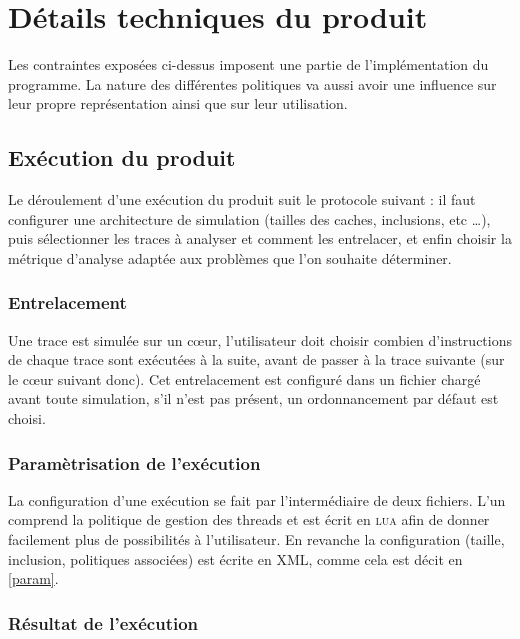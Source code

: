 \section{Détails techniques du produit}

Les contraintes exposées ci-dessus imposent une partie de l'implémentation du programme. La nature des différentes politiques va aussi avoir une influence sur leur propre représentation ainsi que sur leur utilisation.

\subsection{Exécution du produit}

Le déroulement d'une exécution du produit suit le protocole suivant : il faut configurer une architecture de simulation (tailles des caches, inclusions, etc \ldots), puis sélectionner les traces à analyser et comment les entrelacer, et enfin choisir la métrique d'analyse adaptée aux problèmes que l'on souhaite déterminer.

\subsubsection{Entrelacement}

Une trace est simulée sur un c\oe ur, l'utilisateur doit choisir combien d'instructions de chaque trace sont exécutées à la suite, avant de passer à la trace suivante (sur le c\oe ur suivant donc). Cet entrelacement est configuré dans un fichier chargé avant toute simulation, s'il n'est pas présent, un ordonnancement par défaut est choisi. 

\subsubsection{Paramètrisation de l'exécution}

La configuration d'une exécution se fait par l'intermédiaire de deux fichiers. L'un comprend la politique de gestion des threads et est écrit en \textsc{lua} afin de donner facilement plus de possibilités à l'utilisateur. En revanche la configuration (taille, inclusion, politiques associées) est écrite en \textsc{XML}, comme cela est décit en \ref{param}.

\subsubsection{Résultat de l'exécution}
\label{métriques}

